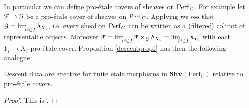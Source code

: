 In particular we can define pro-\'{e}tale covers of sheaves on $\mathrm{Perf}_{C}$. For example let $\mathcal{F}\to\mathcal{G}$ be a pro-\'{e}tale cover of sheaves on $\mathrm{Perf}_{C}$. Applying \cite[lemma 0.12]{Johnstone77} we see that $\mathcal{G}=\varinjlim_{i\in I}{h_{X_i}}$, i.e. every sheaf on $\mathrm{Perf}_{C}$ can be written as a (filtered) colimit of representable objects. Moreover $\mathcal{F}=\varinjlim_{i\in I}\mathcal{F}\times_{\mathcal{G}}{h_{X_i}}=\varinjlim_{i\in I}{h_{Y_i}}$ with each $Y_i\to X_i$ pro-\'{e}tale cover. Proposition \ref{descentprop1} has then  the following analogue:
\begin{prop}
Descent data are effective for finite \'{e}tale morphisms in $\mathbf{Shv}(\mathrm{Perf}_{C})$ relative to pro-\'{e}tale covers.
\end{prop}
\begin{proof}
This is \cite[lemma 4.2.9]{Weinstein16}.
\end{proof}


